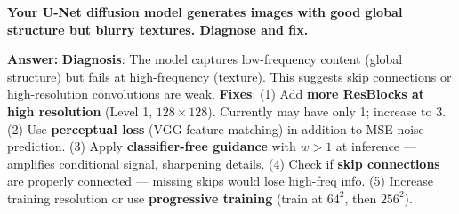 \begin{examq}[Q4: Scenario]
\textbf{Your U-Net diffusion model generates images with good global structure but blurry textures. Diagnose and fix.}

\textbf{Answer:} \textbf{Diagnosis}: The model captures low-frequency content (global structure) but fails at high-frequency (texture). This suggests skip connections or high-resolution convolutions are weak. \textbf{Fixes}: (1) Add \textbf{more ResBlocks at high resolution} (Level 1, $128{\times}128$). Currently may have only 1; increase to 3. (2) Use \textbf{perceptual loss} (VGG feature matching) in addition to MSE noise prediction. (3) Apply \textbf{classifier-free guidance} with $w > 1$ at inference — amplifies conditional signal, sharpening details. (4) Check if \textbf{skip connections} are properly connected — missing skips would lose high-freq info. (5) Increase training resolution or use \textbf{progressive training} (train at $64^2$, then $256^2$).
\end{examq}
